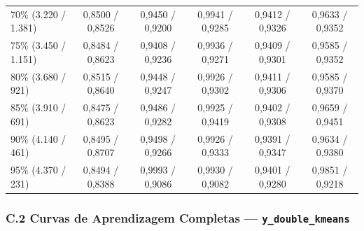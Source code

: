 \documentclass[a4paper,11pt]{article}
\begin{document}
\begin{center}
\begin{minipage}{\linewidth}
\begin{tabular}{l c c c c c}
70\% (3.220 / 1.381) & 0,8500 / 0,8526 & 0,9450 / 0,9200 & 0,9941 / 0,9285 & 0,9412 / 0,9326 & 0,9633 / 0,9352 \\
75\% (3.450 / 1.151) & 0,8484 / 0,8623 & 0,9408 / 0,9236 & 0,9936 / 0,9271 & 0,9409 / 0,9301 & 0,9585 / 0,9352 \\
80\% (3.680 / 921) & 0,8515 / 0,8640 & 0,9448 / 0,9247 & 0,9926 / 0,9302 & 0,9411 / 0,9306 & 0,9585 / 0,9370 \\
85\% (3.910 / 691) & 0,8475 / 0,8623 & 0,9486 / 0,9282 & 0,9925 / 0,9419 & 0,9402 / 0,9308 & 0,9659 / 0,9451 \\
90\% (4.140 / 461) & 0,8495 / 0,8707 & 0,9498 / 0,9266 & 0,9926 / 0,9333 & 0,9391 / 0,9347 & 0,9634 / 0,9380 \\
95\% (4.370 / 231) & 0,8494 / 0,8388 & 0,9993 / 0,9086 & 0,9930 / 0,9082 & 0,9401 / 0,9280 & 0,9851 / 0,9218 \\
\bottomrule
\end{tabular}
\end{minipage}
\end{center}


\subsubsection*{\texorpdfstring{C.2 Curvas de Aprendizagem Completas --- \texttt{y\_double\_kmeans}}{C.2 Curvas de Aprendizagem Completas - ydoublekmeans}}\label{sec:c-2-curvas-de-aprendizagem-completas-ydoublekmeans}
\end{document}
